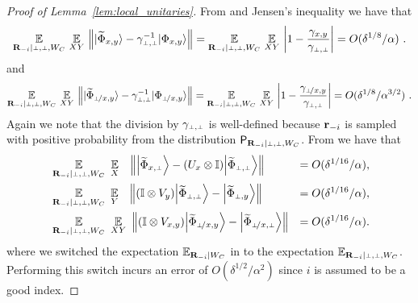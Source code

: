 \begin{proof}[Proof of Lemma~\ref{lem:local_unitaries}]
From  and Jensen's inequality we have that
\begin{align}
\Ex_{\bR_\mi | \dummy, \dummy, W_C} \, \Ex_{XY} \,  \left \|\ket{\wt{\Phi}_{x,y}} - \gamma_{\dummy,\dummy}^{-1}\ket{\Phi_{x,y}} \right \| = \Ex_{\bR_\mi | \dummy, \dummy, W_C} \,\Ex_{XY} \, \left|1 - \frac{\gamma_{x,y}}{\gamma_{\dummy,\dummy}} \right| = O(\delta^{1/8}/\alpha)~.\label{eq:local_unitaries-0}
\end{align}
and
\begin{align}
\Ex_{\bR_\mi | \dummy, \dummy, W_C} \, \Ex_{XY} \,  \left \|\ket{\wt{\Phi}_{\pxy}} - \gamma_{\dummy,\dummy}^{-1}\ket{\Phi_{\pxy}} \right \| = \Ex_{\bR_\mi | \dummy, \dummy, W_C} \,\Ex_{XY} \, \left|1 - \frac{\gamma_{\pxy}}{\gamma_{\dummy,\dummy}} \right| = O(\delta^{1/8}/\alpha^{3/2})~.\label{eq:local_unitaries-0b}
\end{align}
Again we note that the division by $\gamma_\pp$ is well-defined because $\mathbf{r}_{-i}$ is sampled with positive probability from the distribution $\P_{\bR_\mi | \dummy,\dummy,W_C}$. From  we have that
\begin{align}
	&\Ex_{\bR_\mi | \dummy,\dummy,W_C} \,\, \Ex_X \,\, \,\,\, \left \| \bigket{\wt{\Phi}_\xp } - (U_{x} \otimes \Id)  \bigket{\wt{\Phi}_\pp}  \right \| &=  O(\delta^{1/16}/\alpha),\label{eq:ux_bound-2}\\
	&\Ex_{\bR_\mi | \dummy,\dummy,W_C} \,\, \Ex_Y \,\, \,\,\, \left \| (\Id \otimes V_{y})  \bigket{\wt{\Phi}_\pp}  - \bigket{\wt{\Phi}_\py }  \right \| &=  O(\delta^{1/16}/\alpha),\label{eq:vy_bound-2}\\
	&\Ex_{\bR_\mi | \dummy,\dummy,W_C} \,\, \Ex_{XY} \,\,  \left \|  (\Id \otimes V_{\xy})  \bigket{\wt{\Phi}_\pxy}  - \bigket{\wt{\Phi}_\pxp }  \right \| &=  O(\delta^{1/16}/\alpha).\label{eq:vxy_bound-2}
		\end{align}
where we switched the expectation $\operatorname*{\mathbb{E}}_{\mathbf{R}_{-i} | W_C}$ in  to the expectation $\Ex_{\bR_\mi | \dummy,\dummy,W_C}$. Performing this switch incurs an error of $O(\delta^{1/2}/\alpha^2)$ since $i$ is assumed to be a good index. 


\end{proof}
